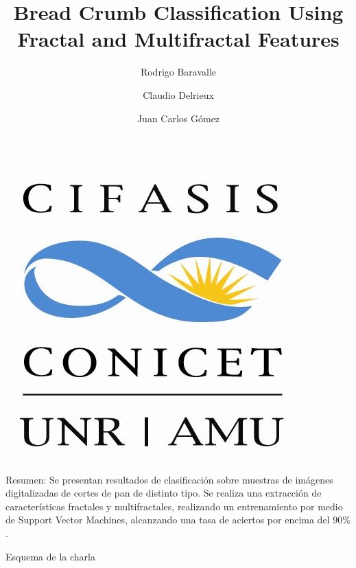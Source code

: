 \documentclass{beamer}
\title[Bread Crumb Classification Using Fractal and Multifr. Features] %
{Bread Crumb Classification Using Fractal and Multifractal Features}
\author
{Rodrigo Baravalle\inst{1} \and Claudio Delrieux\inst{2} \and Juan Carlos G\'omez\inst{1}}
\institute
{
  \inst{1}%
  Laboratorio de Sistemas Din\'amicos y Procesamiento de Informaci\'on. FCEIA, Universidad Nacional de Rosario - CIFASIS - CONICET. \{baravalle,gomez\}@cifasis-conicet.gov.ar
  \and
  \inst{2}%
DIEC, Universidad Nacional del Sur - IIIE-CONICET. cad@uns.edu.ar
}
\date[Noviembre 2012] %
\begin{document}
\begin{frame}
  \titlepage
    \begin{center}
    \includegraphics[scale=0.08]{cifasislogo}
    \end{center}
\end{frame}

\begin{frame}
{\huge Resumen:}
Se presentan resultados de clasificaci\'on sobre muestras de im\'agenes digitalizadas de cortes de pan de distinto tipo. Se realiza una extracci\'on de caracter\'isticas fractales y multifractales, realizando un entrenamiento por medio de Support Vector Machines, alcanzando una tasa de aciertos por encima del $90\%$.
\end{frame}

\begin{frame}{Esquema de la charla}
  \tableofcontents[pausesections]
\end{frame}



\end{document}
